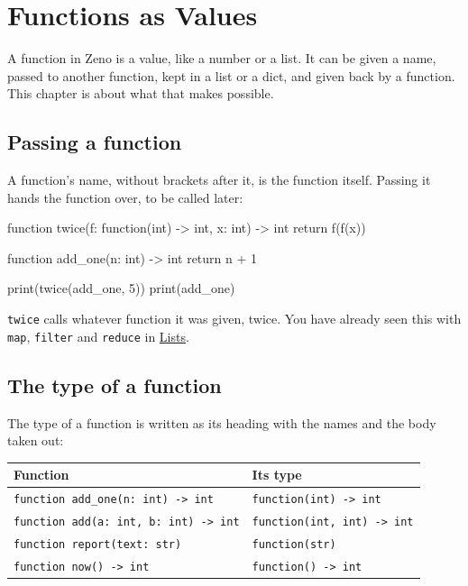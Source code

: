 \chapter{Functions as Values}\label{ch-function-values}

A function in Zeno is a value, like a number or a list. It can be
given a name, passed to another function, kept in a list or a dict,
and given back by a function. This chapter is about what that makes
possible.

\section{Passing a function}

A function's name, without brackets after it, is the function itself.
Passing it hands the function over, to be called later:

\begin{zeno}
function twice(f: function(int) -> int, x: int) -> int {
    return f(f(x))
}

function add_one(n: int) -> int {
    return n + 1
}

print(twice(add_one, 5))
print(add_one)
\end{zeno}

\verb|twice| calls whatever function it was given, twice. You have
already seen this with \verb|map|, \verb|filter| and \verb|reduce| in
\hyperref[ch-lists]{Lists}.

\section{The type of a function}

The type of a function is written as its heading with the names and
the body taken out:

\begin{center}
\begin{tabular}{ll}
\toprule
Function & Its type \\
\midrule
\verb|function add_one(n: int) -> int| & \verb|function(int) -> int| \\
\verb|function add(a: int, b: int) -> int| & \verb|function(int, int) -> int| \\
\verb|function report(text: str)| & \verb|function(str)| \\
\verb|function now() -> int| & \verb|function() -> int| \\
\bottomrule
\end{tabular}
\end{center}

